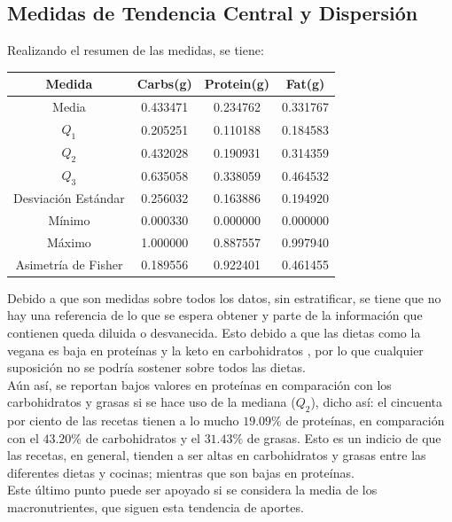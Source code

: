 \documentclass[12pt,a4paper]{article}
\begin{document}
    \subsection{Medidas de Tendencia Central y Dispersión}
    Realizando el resumen de las medidas, se tiene:
    \begin{center}
        \begin{tabular}{|c|ccc|}
            \hline
            Medida & Carbs(g) & Protein(g) & Fat(g) \\
            \hline
            Media               & 0.433471 & 0.234762 & 0.331767 \\
            $Q_1$               & 0.205251 & 0.110188 & 0.184583 \\
            $Q_2$               & 0.432028 & 0.190931 & 0.314359 \\
            $Q_3$               & 0.635058 & 0.338059 & 0.464532 \\
            Desviación Estándar & 0.256032 & 0.163886 & 0.194920 \\
            Mínimo              & 0.000330 & 0.000000 & 0.000000 \\
            Máximo              & 1.000000 & 0.887557 & 0.997940 \\
            Asimetría de Fisher & 0.189556 & 0.922401 & 0.461455 \\
            \hline
        \end{tabular}
    \end{center}
    Debido a que son medidas sobre todos los datos, sin estratificar, 
    se tiene que no hay una referencia de lo que se espera obtener y 
    parte de la información que contienen queda diluida o desvanecida. 
    Esto debido a que las dietas como la vegana es baja en proteínas y 
    la keto en carbohidratos \cite{marvastipopular}, por lo que cualquier 
    suposición no se podría sostener sobre todos las dietas.\\

    Aún así, se reportan bajos valores en proteínas en comparación 
    con los carbohidratos y grasas si se hace uso de la mediana ($Q_2$), 
    dicho así: el cincuenta por ciento de las recetas tienen a lo mucho  
    $19.09\%$ de proteínas, en comparación con el $43.20\%$ de carbohidratos 
    y el $31.43\%$ de grasas. Esto es un indicio de que las recetas, en general, 
    tienden a ser altas en carbohidratos y grasas entre las diferentes dietas y 
    cocinas; mientras que son bajas en proteínas.\\
    Este último punto puede ser apoyado si se considera la media de los 
    macronutrientes, que siguen esta tendencia de aportes.\\
\end{document}
